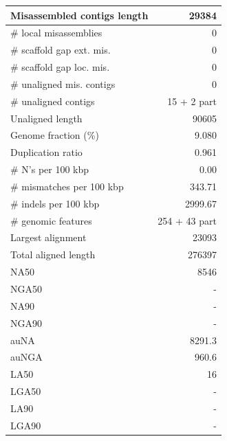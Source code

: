 \documentclass[12pt,a4paper]{article}
\begin{document}
\begin{table}[ht]
\begin{center}
\begin{tabular}{|l*{1}{|r}|}
Misassembled contigs length & 29384 \\ \hline
\# local misassemblies & 0 \\ \hline
\# scaffold gap ext. mis. & 0 \\ \hline
\# scaffold gap loc. mis. & 0 \\ \hline
\# unaligned mis. contigs & 0 \\ \hline
\# unaligned contigs & 15 + 2 part \\ \hline
Unaligned length & 90605 \\ \hline
Genome fraction (\%) & 9.080 \\ \hline
Duplication ratio & 0.961 \\ \hline
\# N's per 100 kbp & 0.00 \\ \hline
\# mismatches per 100 kbp & 343.71 \\ \hline
\# indels per 100 kbp & 2999.67 \\ \hline
\# genomic features & 254 + 43 part \\ \hline
Largest alignment & 23093 \\ \hline
Total aligned length & 276397 \\ \hline
NA50 & 8546 \\ \hline
NGA50 & - \\ \hline
NA90 & - \\ \hline
NGA90 & - \\ \hline
auNA & 8291.3 \\ \hline
auNGA & 960.6 \\ \hline
LA50 & 16 \\ \hline
LGA50 & - \\ \hline
LA90 & - \\ \hline
LGA90 & - \\ \hline
\end{tabular}
\end{center}
\end{table}
\end{document}
